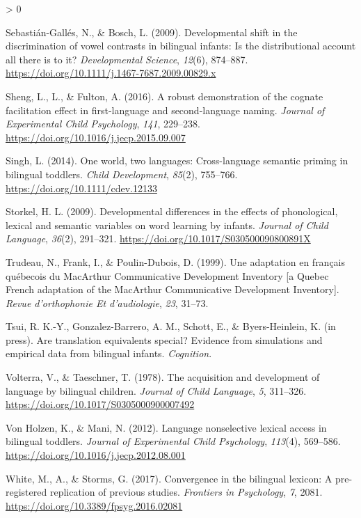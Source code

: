 \documentclass[
  english,
  ,man,floatsintext]{apa6}
\newlength{\cslhangindent}
\newenvironment{CSLReferences}[2] %
 {%
  \setlength{\parindent}{0pt}
  \ifodd #1 \everypar{\setlength{\hangindent}{\cslhangindent}}\ignorespaces\fi
  \ifnum #2 > 0
  \setlength{\parskip}{#2\baselineskip}
  \fi
 }%
 {}
\begin{document}
\begin{CSLReferences}{1}{0}
\leavevmode\hypertarget{ref-Sebastiuxe1n-Galluxe9s_Bosch_2009}{}%
Sebastián-Gallés, N., \& Bosch, L. (2009). Developmental shift in the discrimination of vowel contrasts in bilingual infants: Is the distributional account all there is to it? \emph{Developmental Science}, \emph{12}(6), 874--887. \url{https://doi.org/10.1111/j.1467-7687.2009.00829.x}

\leavevmode\hypertarget{ref-Sheng_etal_2016}{}%
Sheng, L., L., \& Fulton, A. (2016). A robust demonstration of the cognate facilitation effect in first-language and second-language naming. \emph{Journal of Experimental Child Psychology}, \emph{141}, 229--238. \url{https://doi.org/10.1016/j.jecp.2015.09.007}

\leavevmode\hypertarget{ref-Singh_2014}{}%
Singh, L. (2014). One world, two languages: Cross-language semantic priming in bilingual toddlers. \emph{Child Development}, \emph{85}(2), 755--766. \url{https://doi.org/10.1111/cdev.12133}

\leavevmode\hypertarget{ref-Storkel_2009}{}%
Storkel, H. L. (2009). Developmental differences in the effects of phonological, lexical and semantic variables on word learning by infants. \emph{Journal of Child Language}, \emph{36}(2), 291--321. \url{https://doi.org/10.1017/S030500090800891X}

\leavevmode\hypertarget{ref-Trudeau_etal_1999}{}%
Trudeau, N., Frank, I., \& Poulin-Dubois, D. (1999). Une adaptation en français québecois du MacArthur {C}ommunicative {D}evelopment {I}nventory {[}a {Q}uebec {F}rench adaptation of the MacArthur {C}ommunicative {D}evelopment {I}nventory{]}. \emph{Revue d'orthophonie Et d'audiologie}, \emph{23}, 31--73.

\leavevmode\hypertarget{ref-Tsui_etal_2021}{}%
Tsui, R. K.-Y., Gonzalez-Barrero, A. M., Schott, E., \& Byers-Heinlein, K. (in press). Are translation equivalents special? Evidence from simulations and empirical data from bilingual infants. \emph{Cognition}.

\leavevmode\hypertarget{ref-Volterra_Taeschner_1978}{}%
Volterra, V., \& Taeschner, T. (1978). The acquisition and development of language by bilingual children. \emph{Journal of Child Language}, \emph{5}, 311--326. \url{https://doi.org/10.1017/S0305000900007492}

\leavevmode\hypertarget{ref-VonHolzen_Mani_2012}{}%
Von Holzen, K., \& Mani, N. (2012). Language nonselective lexical access in bilingual toddlers. \emph{Journal of Experimental Child Psychology}, \emph{113}(4), 569--586. \url{https://doi.org/10.1016/j.jecp.2012.08.001}

\leavevmode\hypertarget{ref-White_etal_2017}{}%
White, M., A., \& Storms, G. (2017). Convergence in the bilingual lexicon: A pre-registered replication of previous studies. \emph{Frontiers in Psychology}, \emph{7}, 2081. \url{https://doi.org/10.3389/fpsyg.2016.02081}

\end{CSLReferences}

\endgroup
\end{document}
